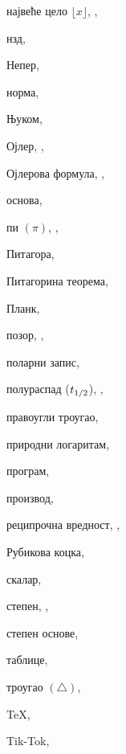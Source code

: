 \begin{theindex}
  \indexspace

  \item највеће цело $\lfloor x\rfloor$, , 
  \item нзд, 
  \item Непер, 
  \item норма, 

  \indexspace

  \item Њуком, 

  \indexspace

  \item Ојлер, , 
  \item Ојлерова формула, , 
  \item основа, 

  \indexspace

  \item пи $(\pi)$, , 
  \item Питагора, 
  \item Питагорина теорема, 
  \item Планк, 
  \item позор, , 
  \item поларни запис, 
  \item полураспад ($t_{1/2}$), , 
  \item правоугли троугао, 
  \item природни логаритам, 
  \item програм, 
  \item производ, 

  \indexspace

  \item реципрочна вредност, , 
  \item Рубикова коцка, 

  \indexspace

  \item скалар, 
  \item степен, , 
  \item степен основе, 

  \indexspace

  \item таблице, 
  \item троугао $(\triangle )$, 
  \interskip
  \item \TeX, 
  \item Tik-Tok, 


\end{theindex}
